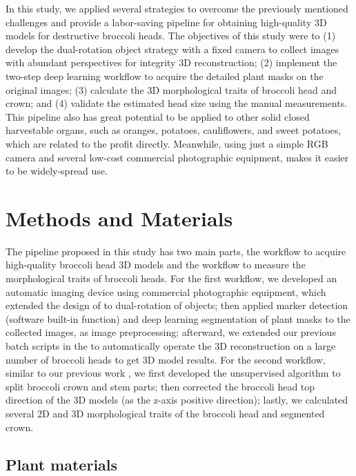 In this study, we applied several strategies to overcome the previously mentioned challenges and provide a labor-saving pipeline for obtaining high-quality 3D models for destructive broccoli heads. The objectives of this study were to (1) develop the dual-rotation object strategy with a fixed camera to collect images with abundant perspectives for integrity 3D reconstruction; (2) implement the two-step deep learning workflow to acquire the detailed plant masks on the original images; (3) calculate the 3D morphological traits of broccoli head and crown; and (4) validate the estimated head size using the manual measurements. This pipeline also has great potential to be applied to other solid closed harvestable organs, such as oranges, potatoes, cauliflowers, and sweet potatoes, which are related to the profit directly. Meanwhile, using just a simple RGB camera and several low-cost commercial photographic equipment, makes it easier to be widely-spread use.


\section{Methods and Materials}

The pipeline proposed in this study has two main parts, the workflow to acquire high-quality broccoli head 3D models and the workflow to measure the morphological traits of broccoli heads. For the first workflow, we developed an automatic imaging device using commercial photographic equipment, which extended the design of \citet{kochi_3d_2018} to dual-rotation of objects; then applied marker detection (software built-in function) and deep learning segmentation of plant masks to the collected images, as image preprocessing; afterward, we extended our previous batch scripts in the \citet{feldman_easydcp_2021} to automatically operate the 3D reconstruction on a large number of broccoli heads to get 3D model results. For the second workflow, similar to our previous work \citep{feldman_easydcp_2021}, we first developed the unsupervised algorithm to split broccoli crown and stem parts; then corrected the broccoli head top direction of the 3D models (as the z-axis positive direction); lastly, we calculated several 2D and 3D morphological traits of the broccoli head and segmented crown.

\subsection{Plant materials}

